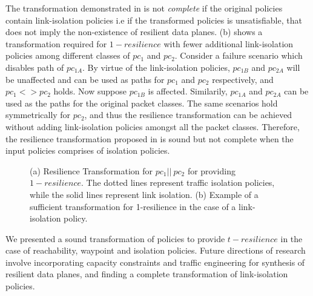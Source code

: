 \noindent The transformation demonstrated in  is not \emph{complete}
 if the original policies contain link-isolation policies i.e if the transformed policies
 is unsatisfiable, that does not imply the non-existence of resilient data planes. 
 (b) shows a  transformation required for $1-resilience$ 
 with fewer additional link-isolation policies among different classes
 of $pc_1$ and $pc_2$. Consider a failure scenario which disables path
 of $pc_{1A}$. By virtue of the link-isolation policies, $pc_{1B}$ and
 $pc_{2A}$ will be unaffected and can be used as paths for $pc_1$ 
 and $pc_2$ respectively, and $pc_1 <> pc_2$ holds. Now suppose
 $pc_{1B}$ is affected. Similarily, $pc_{1A}$ and $pc_{2A}$ can be used as
 the paths for the original packet classes. The same scenarios hold symmetrically
 for $pc_2$, and thus the resilience transformation can be achieved without
 adding link-isolation policies amongst all the packet classes. Therefore,
 the resilience transformation proposed in  is sound but not
 complete when the input policies comprises of isolation policies. 
 
\begin{figure}
	\centering
	\caption{\label{fig:restransform}
		(a) Resilience Transformation for $pc_1 || \ pc_2$ for providing $1-resilience$. 
		The dotted lines represent traffic isolation policies, 
		while the solid lines represent link isolation. (b) Example of a sufficient transformation
		for 1-resilience in the case of a link-isolation policy.}
\end{figure}

We presented a sound transformation of policies to provide $t-resilience$ in
the case of reachability, waypoint and isolation policies. Future directions of 
research involve incorporating capacity constraints and traffic engineering
for synthesis of resilient data planes, and finding a complete transformation of
link-isolation policies. 